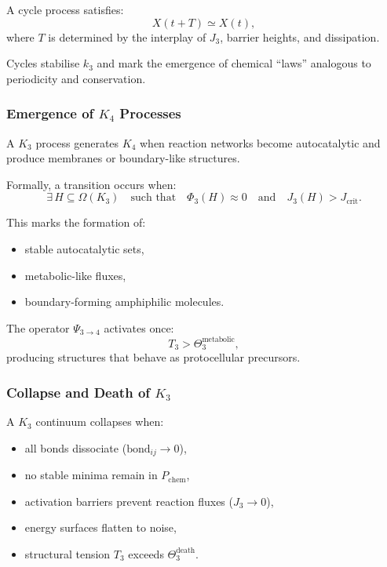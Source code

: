 A cycle process satisfies:
\[
X(t + T) \simeq X(t),
\]
where $T$ is determined by the interplay of $J_3$, barrier heights, and
dissipation.

Cycles stabilise $k_3$ and mark the emergence of chemical ``laws'' analogous
to periodicity and conservation.

\subsubsection{Emergence of \texorpdfstring{$K_4$}{K_4} Processes}

A $K_3$ process generates $K_4$ when reaction networks become
autocatalytic and produce membranes or boundary-like structures.

Formally, a transition occurs when:
\[
\exists\, H \subseteq \Omega(K_3)
\quad \text{such that} \quad
\Phi_3(H) \approx 0 \quad \text{and} \quad
J_3(H) > J_{\text{crit}}.
\]

This marks the formation of:
\begin{itemize}
    \item stable autocatalytic sets,
    \item metabolic-like fluxes,
    \item boundary-forming amphiphilic molecules.
\end{itemize}

The operator $\Psi_{3\to4}$ activates once:
\[
T_3 > \Theta_3^{\text{metabolic}},
\]
producing structures that behave as protocellular precursors.

\subsubsection{Collapse and Death of \texorpdfstring{$K_3$}{K_3}}

A $K_3$ continuum collapses when:

\begin{itemize}
    \item all bonds dissociate ($\text{bond}_{ij} \to 0$),
    \item no stable minima remain in $P_\text{chem}$,
    \item activation barriers prevent reaction fluxes ($J_3\to 0$),
    \item energy surfaces flatten to noise,
    \item structural tension $T_3$ exceeds $\Theta_3^{\text{death}}$.
\end{itemize}

